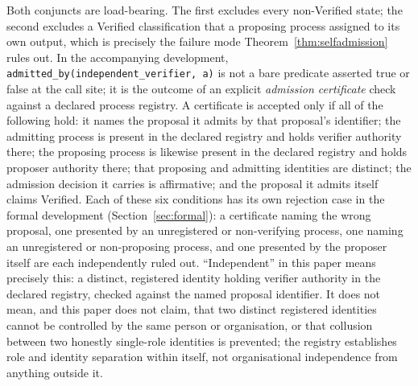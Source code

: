 \documentclass[smallcondensed,envcountsect,natbib]{svjour3}
\newcommand{\state}[1]{\textsf{#1}}
\begin{document}
Both conjuncts are load-bearing. The first excludes every non-\state{Verified} state; the second excludes a \state{Verified} classification that a proposing process assigned to its own output, which is precisely the failure mode Theorem~\ref{thm:selfadmission} rules out. In the accompanying development, \texttt{admitted\_by(independent\_verifier, a)} is not a bare predicate asserted true or false at the call site; it is the outcome of an explicit \emph{admission certificate} check against a declared process registry. A certificate is accepted only if all of the following hold: it names the proposal it admits by that proposal's identifier; the admitting process is present in the declared registry and holds verifier authority there; the proposing process is likewise present in the declared registry and holds proposer authority there; that proposing and admitting identities are distinct; the admission decision it carries is affirmative; and the proposal it admits itself claims \state{Verified}. Each of these six conditions has its own rejection case in the formal development (Section~\ref{sec:formal}): a certificate naming the wrong proposal, one presented by an unregistered or non-verifying process, one naming an unregistered or non-proposing process, and one presented by the proposer itself are each independently ruled out. ``Independent'' in this paper means precisely this: a distinct, registered identity holding verifier authority in the declared registry, checked against the named proposal identifier. It does not mean, and this paper does not claim, that two distinct registered identities cannot be controlled by the same person or organisation, or that collusion between two honestly single-role identities is prevented; the registry establishes role and identity separation within itself, not organisational independence from anything outside it.
\end{document}
